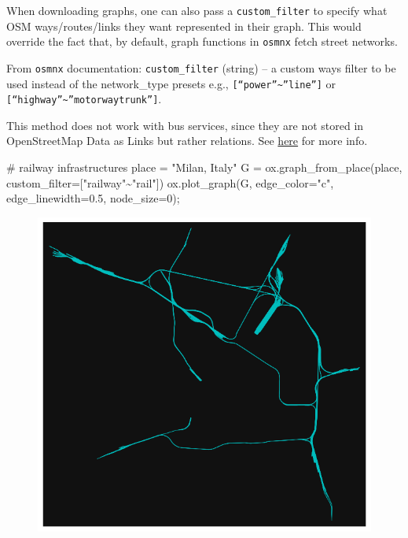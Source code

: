 \documentclass[
  letterpaper,
  DIV=11,
  numbers=noendperiod]{scrreprt}
\newenvironment{Shaded}{\begin{snugshade}}{\end{snugshade}}
\newcommand{\CommentTok}[1]{\textcolor[rgb]{0.37,0.37,0.37}{#1}}
\newcommand{\DecValTok}[1]{\textcolor[rgb]{0.68,0.00,0.00}{#1}}
\newcommand{\FloatTok}[1]{\textcolor[rgb]{0.68,0.00,0.00}{#1}}
\newcommand{\NormalTok}[1]{\textcolor[rgb]{0.00,0.23,0.31}{#1}}
\newcommand{\OperatorTok}[1]{\textcolor[rgb]{0.37,0.37,0.37}{#1}}
\newcommand{\StringTok}[1]{\textcolor[rgb]{0.13,0.47,0.30}{#1}}
\begin{document}
When downloading graphs, one can also pass a \texttt{custom\_filter} to
specify what OSM ways/routes/links they want represented in their graph.
This would override the fact that, by default, graph functions in
\texttt{osmnx} fetch street networks.

From \texttt{osmnx} documentation: \texttt{custom\_filter} (string) -- a
custom ways filter to be used instead of the network\_type presets e.g.,
\texttt{{[}“power”\textasciitilde{}”line”{]}} or
\texttt{{[}“highway”\textasciitilde{}”motorway\textbar{}trunk”{]}}.

This method does not work with bus services, since they are not stored
in OpenStreetMap Data as Links but rather relations. See
\href{https://wiki.openstreetmap.org/wiki/Buses}{here} for more info.

\begin{Shaded}
\begin{Highlighting}[]
\CommentTok{\# railway infrastructures}
\NormalTok{place }\OperatorTok{=} \StringTok{"Milan, Italy"}
\NormalTok{G }\OperatorTok{=}\NormalTok{ ox.graph\_from\_place(place, custom\_filter}\OperatorTok{=}\StringTok{\textquotesingle{}["railway"\textasciitilde{}"rail"]\textquotesingle{}}\NormalTok{)}
\NormalTok{ox.plot\_graph(G, edge\_color}\OperatorTok{=}\StringTok{"c"}\NormalTok{, edge\_linewidth}\OperatorTok{=}\FloatTok{0.5}\NormalTok{, node\_size}\OperatorTok{=}\DecValTok{0}\NormalTok{)}\OperatorTok{;}
\end{Highlighting}
\end{Shaded}

\begin{figure}[H]

{\centering \includegraphics{labs/w07_OSM_files/figure-pdf/cell-41-output-1.png}

}

\end{figure}
\end{document}
